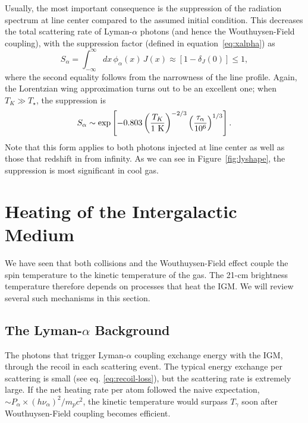 \documentclass[a4paper,openany, 12pt]{book}
\begin{document}
Usually, the most important consequence is the suppression of the radiation spectrum at line center compared to the assumed initial condition.  This decreases the total scattering rate of Lyman-$\alpha$ photons (and hence the Wouthuysen-Field coupling), with the suppression factor (defined in equation~\ref{eq:xalpha}) as \cite{chen04} 
\begin{equation}
S_\alpha = \int_{-\infty}^\infty d x \, \phi_\alpha(x)\, J(x) \approx
[1 - \delta_J(0)] \le 1,
\label{eq:salpha-defn}
\end{equation}
where the second equality follows from the narrowness of the line profile.  Again, the Lorentzian wing approximation turns out to be an excellent one; when $T_K \gg T_\star$, the suppression is \cite{furl06-lyheat}
\begin{equation} S_\alpha \sim \exp \left[ -0.803 \left({T_K\over
1~{\rm K}}\right)^{-2/3} \left( \frac{\tau_\alpha}{10^{6}}
\right)^{1/3} \right].
\label{eq:salpha-approx}
\end{equation}
Note that this form applies to both photons injected at line center as well as those that redshift in from infinity.  As we can see in Figure~\ref{fig:lyshape}, the suppression is most significant in cool gas.


\section{Heating of the Intergalactic Medium} 

We have seen that both collisions and the Wouthuysen-Field effect couple the spin temperature to the kinetic temperature of the gas. The 21-cm brightness temperature therefore depends on processes that heat the IGM. We will review several such mechanisms in this section.

\subsection{The Lyman-$\alpha$ Background}

The photons that trigger Lyman-$\alpha$ coupling exchange energy with the IGM, through the recoil in each scattering event. The typical energy exchange per scattering is small (see eq. \ref{eq:recoil-loss}), but the scattering rate is extremely large.  If the net heating rate per atom followed the naive expectation, $\sim
P_\alpha \times (h \nu_\alpha)^2/m_p c^2$, the kinetic temperature would surpass $T_\gamma$ soon after Wouthuysen-Field coupling becomes efficient.
\end{document}

